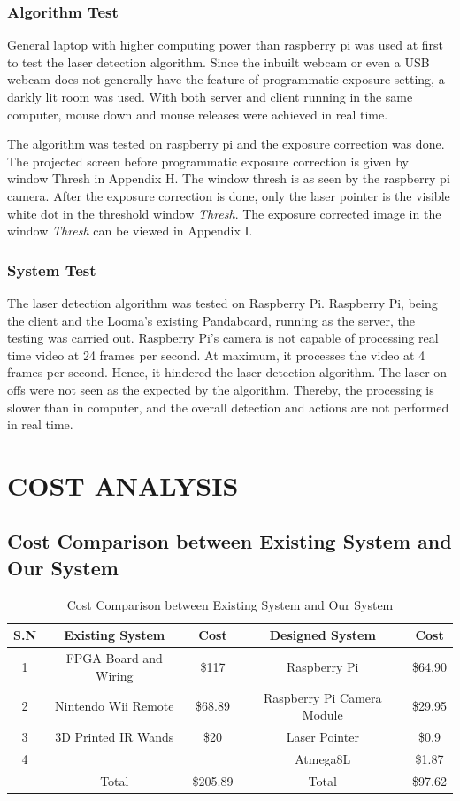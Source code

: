 \documentclass[12pt, a4paper]{article}
\begin{document}
\subsubsection{Algorithm Test}
General laptop with higher computing power than raspberry pi was used at first to test the laser detection algorithm. Since the inbuilt webcam or even a USB webcam does not generally have the feature of programmatic exposure setting, a darkly lit room was used. With both server and client running in the same computer, mouse down and mouse releases were achieved in real time. 

The algorithm was tested on raspberry pi and the exposure correction was done. The projected screen before programmatic exposure correction is given by window Thresh in Appendix H. The window thresh is as seen by the raspberry pi camera. After the exposure correction is done, only the laser pointer is the visible white dot in the threshold window \emph{Thresh}. The exposure corrected image in the window \emph{Thresh} can be viewed in Appendix I.

\subsubsection{System Test}

The laser detection algorithm was tested on Raspberry Pi. Raspberry Pi, being the client and the Looma’s existing Pandaboard, running as the server, the testing was carried out.
Raspberry Pi's camera is not capable of processing real time video at 24 frames per second. At maximum, it processes the video at 4 frames per second. Hence, it hindered the laser detection algorithm. The laser on-offs were not seen as the expected by the algorithm. Thereby, the processing  is slower than in computer, and the overall detection and actions are not performed in real time. 

\newpage
\section{COST ANALYSIS}
\subsection{Cost Comparison between Existing System and Our System}
\begin{table}[ht]
\begin{tabular}{|c|c|c|c|c|}
\hline
	S.N  & Existing System & Cost & Designed System & Cost\\
\hline
	1 & FPGA Board and Wiring & \$117 & Raspberry Pi & \$64.90\\
\hline
	2 & Nintendo Wii Remote & \$68.89 & Raspberry Pi Camera Module & \$29.95 \\
\hline
	3 & 3D Printed IR Wands & \$20 & Laser Pointer & \$0.9\\
\hline
	4 &  &  & Atmega8L & \$1.87\\
\hline
	 & Total & \$205.89 & Total & \$97.62\\
\hline
\end{tabular}
\caption{Cost Comparison between Existing System and Our System}
\label{tb:sw}
\end{table}
\end{document}
